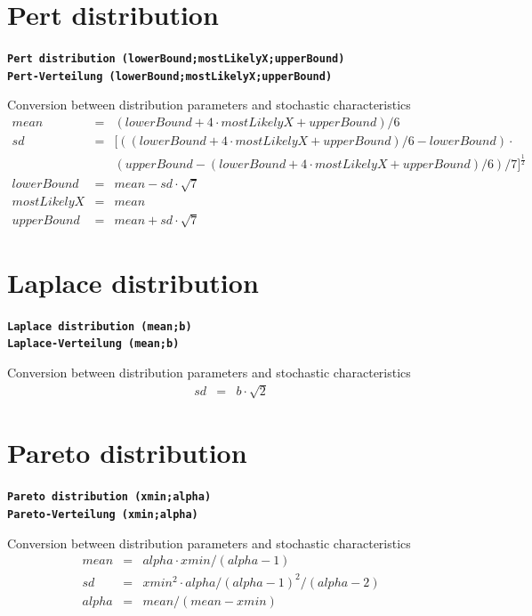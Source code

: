 \documentclass{svmono}
\def\cm#1{\textbf{\texttt{#1}}}
\begin{document}
\section*{Pert distribution}
\cm{Pert distribution (lowerBound;mostLikelyX;upperBound)}~\\
\cm{Pert-Verteilung (lowerBound;mostLikelyX;upperBound)}

Conversion between distribution parameters and stochastic characteristics
\begin{eqnarray*}
mean&=&(lowerBound+4\cdot mostLikelyX+upperBound)/6\\
sd&=&\Big[((lowerBound+4\cdot mostLikelyX+upperBound)/6-lowerBound)\cdot\\
~&~&(upperBound-(lowerBound+4\cdot mostLikelyX+upperBound)/6)/7\Big]^{\frac{1}{2}}\\
lowerBound&=&mean-sd\cdot\sqrt{7}\\
mostLikelyX&=&mean\\
upperBound&=&mean+sd\cdot\sqrt{7}
\end{eqnarray*}





\section*{Laplace distribution}
\cm{Laplace distribution (mean;b)}~\\
\cm{Laplace-Verteilung (mean;b)}

Conversion between distribution parameters and stochastic characteristics
\begin{eqnarray*}
sd&=&b\cdot\sqrt{2}
\end{eqnarray*}





\section*{Pareto distribution}
\cm{Pareto distribution (xmin;alpha)}~\\
\cm{Pareto-Verteilung (xmin;alpha)}

Conversion between distribution parameters and stochastic characteristics
\begin{eqnarray*}
mean&=&alpha\cdot xmin/(alpha-1)\\
sd&=&xmin^2\cdot alpha/(alpha-1)^2/(alpha-2)\\
alpha&=&mean/(mean-xmin)
\end{eqnarray*}
\end{document}
